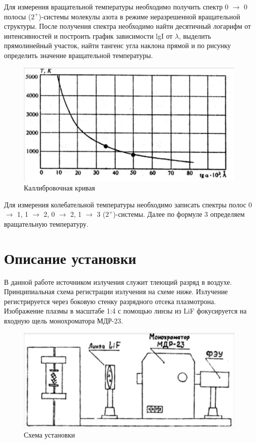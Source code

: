 \documentclass[a4paper,12pt]{article}
\begin{document}
	Для измерения вращательной температуры необходимо получить спектр 0 $\rightarrow $ 0 полосы ($2^+$)-системы молекулы азота в режиме неразрешенной вращательной структуры. После получения спектра необходимо найти десятичный логарифм от интенсивностей и построить график зависимости lgI от $\lambda$, выделить прямолинейный участок, найти тангенс угла наклона прямой и по рисунку определить значение вращательной температуры.
	\begin{figure}[h]
		\begin{center}
			\includegraphics[scale=0.5]{kalibr}
			\caption{Каллибровочная кривая}
		\end{center}
	\end{figure}
Для измерения колебательной температуры необходимо записать спектры полос 0 $\rightarrow $ 1, 1 $\rightarrow $ 2, 0 $\rightarrow $ 2, 1 $\rightarrow $ 3 ($2^{+}$)-системы. Далее по формуле 3 определяем вращательную температуру.

	\section{Описание установки}
	В данной работе источником излучения служит тлеющий разряд в воздухе.
Принципиальная схема регистрации излучения на схеме ниже. Излучение
регистрируется через боковую стенку разрядного отсека плазмотрона. Изображение плазмы в
масштабе 1:4 с помощью линзы из LiF фокусируется на входную щель монохроматора МДР-23.

	\begin{figure}[h]
		\begin{center}
			\includegraphics[scale=0.5]{ystanovka}
			\caption{Схема установки}
		\end{center}
	\end{figure}
\end{document}
